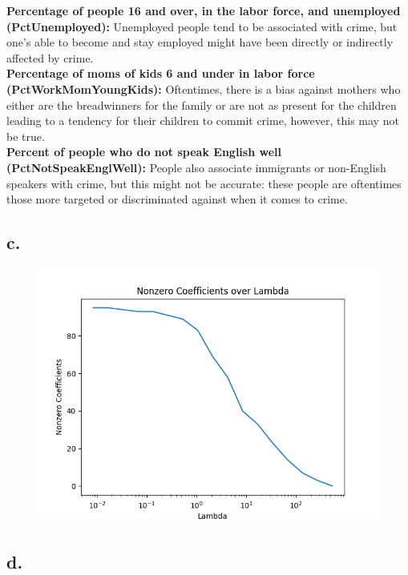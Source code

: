 \documentclass{article}
\newcommand{\1}{\mathbf{1}}
\begin{document}
{\textbf{Percentage of people 16 and over, in the labor force, and unemployed (PctUnemployed):} Unemployed people tend to be associated with crime, but one's able to become and stay employed might have been directly or indirectly affected by crime. \\
\textbf{Percentage of moms of kids 6 and under in labor force (PctWorkMomYoungKids):} Oftentimes, there is a bias against mothers who either are the breadwinners for the family or are not as present for the children leading to a tendency for their children to commit crime, however, this may not be true. \\
\textbf{Percent of people who do not speak English well (PctNotSpeakEnglWell):} People also associate immigrants or non-English speakers with crime, but this might not be accurate: these people are oftentimes those more targeted or  discriminated against when it comes to crime. \\

\subsection*{c.}

\begin{figure}[ht!]
  \centering
  \includegraphics[width=180mm]{../hw2-code/results/a5_c.png}
\end{figure}

\newpage

\subsection*{d.}

}
\end{document}
